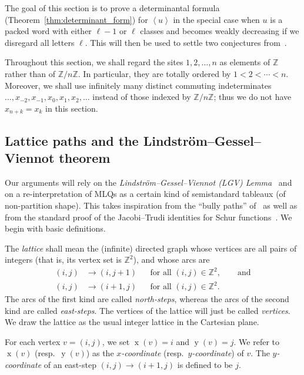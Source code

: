 \documentclass[reqno]{amsart}
\newcommand{\0}{\phantom{c}}
\newcommand{\swt}[1]{\left\langle #1 \right\rangle} %
\DeclareMathOperator{\xcoord}{x} %
\DeclareMathOperator{\ycoord}{y} %
\newcommand{\ZZ}{\mathbb{Z}}
\newcommand{\defn}[1]{{\color{darkred}\emph{#1}}} %
\theoremstyle{plain}
\theoremstyle{definition}
\numberwithin{equation}{section}
\begin{document}
The goal of this section is to prove a determinantal formula (Theorem~\ref{thm:determinant_form}) for $\swt{u}$ in the special case when $u$ is a packed word with either $\ell-1$ or $\ell$ classes and becomes weakly decreasing if we disregard all letters $\ell$.
This will then be used to settle two conjectures from~\cite{AasLin17}.

Throughout this section, we shall regard the sites $1, 2, \ldots, n$ as elements of $\ZZ$ rather than of $\ZZ/n\ZZ$.
In particular, they are totally ordered by $1 < 2 < \cdots < n$.
Moreover, we shall use infinitely many distinct commuting indeterminates $\ldots, x_{-2}, x_{-1}, x_0, x_1, x_2, \ldots$ instead of those indexed by $\ZZ/n\ZZ$; thus we do not have $x_{n+k} = x_k$ in this section.


\subsection{Lattice paths and the Lindstr\"{o}m--Gessel--Viennot theorem}

Our arguments will rely on the \defn{Lindstr\"om--Gessel--Viennot (LGV) Lemma}~\cite{GV85,Lindstrom73} and on a re-interpretation of MLQs as a certain kind of semistandard tableaux (of non-partition shape).
This takes inspiration from the ``bully paths'' of~\cite{AasLin17} as well as from the standard proof of the Jacobi--Trudi identities for Schur functions~\cite[First proof of Theorem 7.16.1]{Stanley-EC2}.
We begin with basic definitions.

The \defn{lattice} shall mean the (infinite) directed graph whose vertices are
all pairs of integers (that is, its vertex set is $\ZZ^{2}$), and whose
arcs are
\begin{align*}
(i,j) & \to (i,j+1) & & \text{for all } (i,j) \in \ZZ^2, \qquad \text{and} \\
(i,j) & \to (i+1,j) & & \text{for all } (i,j) \in \ZZ^2.
\end{align*}
The arcs of the first kind are called \defn{north-steps}, whereas the arcs of
the second kind are called \defn{east-steps}. The vertices of the lattice will
just be called \defn{vertices}. We draw the lattice as the usual integer
lattice in the Cartesian plane.

For each vertex $v = (i,j)$, we set $\xcoord(v) = i$ and $\ycoord(v) = j$.
We refer to $\xcoord(v)$ (resp.~$\ycoord(v)$) as the \defn{$x$-coordinate} (resp.~\defn{$y$-coordinate}) of $v$.
The \defn{$y$-coordinate} of an east-step $(i,j) \to (i+1, j)$ is defined to be $j$.
\end{document}
